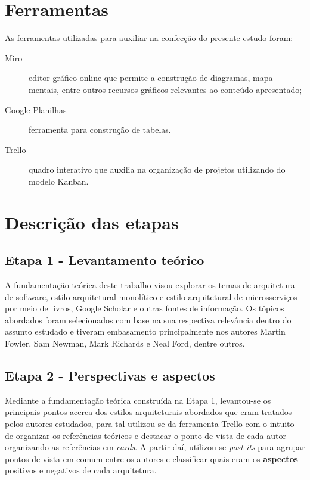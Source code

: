 \section{Ferramentas}

As ferramentas utilizadas para auxiliar na confecção do presente estudo foram:

\begin{description}
    \item[Miro] editor gráfico online que permite a construção de diagramas, mapa mentais, entre
        outros recursos gráficos relevantes ao conteúdo apresentado;
    \item[Google Planilhas] ferramenta para construção de tabelas.
    \item[Trello] quadro interativo que auxilia na organização de projetos utilizando do modelo
        Kanban.
\end{description}

\section{Descrição das etapas}
\subsection{Etapa 1 - Levantamento teórico}

A fundamentação teórica deste trabalho visou explorar os temas de arquitetura de software,
estilo arquitetural monolítico e estilo arquitetural de microsserviços por meio de livros, Google Scholar e
outras fontes de informação. Os tópicos abordados foram selecionados com base na sua respectiva
relevância dentro do assunto estudado e tiveram embasamento principalmente nos autores Martin Fowler,
Sam Newman, Mark Richards e Neal Ford, dentre outros.

\subsection{Etapa 2 - Perspectivas e aspectos}
\label{met:perspectivas}

Mediante a fundamentação teórica construída na Etapa 1, levantou-se os principais pontos acerca dos
estilos arquiteturais abordados que eram tratados pelos autores estudados, para tal utilizou-se da
ferramenta Trello com o intuito de organizar os referências teóricos e destacar o ponto de vista de
cada autor organizando as referências em \textit{cards}. A partir daí, utilizou-se \textit{post-its}
para agrupar pontos de vista em comum entre os autores e classificar quais eram os \textbf{aspectos}
positivos e negativos de cada arquitetura.

